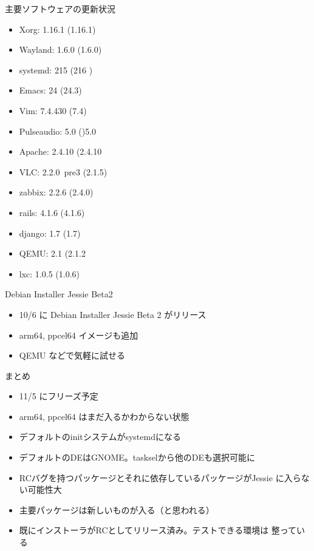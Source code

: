 \begin{frame}{主要ソフトウェアの更新状況}
\begin{itemize}
\item Xorg: 1.16.1 (1.16.1)
\item Wayland: 1.6.0 (1.6.0)
\item systemd: 215 (216 )
\item Emacs: 24 (24.3)
\item Vim: 7.4.430 (7.4)
\item Pulseaudio: 5.0 ()5.0
\item Apache: 2.4.10 (2.4.10
\item VLC: 2.2.0~pre3 (2.1.5) 
\item zabbix: 2.2.6 (2.4.0)
\item rails: 4.1.6 (4.1.6)
\item django: 1.7 (1.7)
\item QEMU: 2.1 (2.1.2
\item lxc: 1.0.5 (1.0.6)
\end{itemize}

\end{frame}

\begin{frame}[containsverbatim]{Debian Installer Jessie Beta2}
\begin{itemize}
\item 10/6 に Debian Installer Jessie Beta 2 がリリース
\item arm64, ppcel64 イメージも追加
\item QEMU などで気軽に試せる
\end{itemize}
\end{frame}

\begin{frame}{まとめ}
\begin{itemize}
\item 11/5 にフリーズ予定
\item arm64, ppcel64 はまだ入るかわからない状態
\item デフォルトのinitシステムがsystemdになる
\item デフォルトのDEはGNOME。taskselから他のDEも選択可能に
\item RCバグを持つパッケージとそれに依存しているパッケージがJessie
に入らない可能性大
\item 主要パッケージは新しいものが入る（と思われる）
\item 既にインストーラがRCとしてリリース済み。テストできる環境は
整っている
\end{itemize}
\end{frame}

